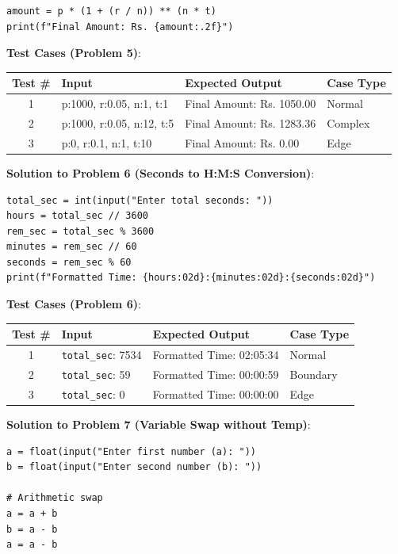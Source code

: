 \begin{solutionbox}
\begin{lstlisting}[language=Python3]
amount = p * (1 + (r / n)) ** (n * t)
print(f"Final Amount: Rs. {amount:.2f}")
\end{lstlisting}
\vspace{4pt}
\noindent\textbf{Test Cases (Problem 5)}:

\noindent\begin{tabular}{|c|p{4cm}|p{4.5cm}|p{2.2cm}|}
\hline
\textbf{Test \#} & \textbf{Input} & \textbf{Expected Output} & \textbf{Case Type} \\
\hline
1 & p:1000, r:0.05, n:1, t:1 & Final Amount: Rs. 1050.00 & Normal \\
2 & p:1000, r:0.05, n:12, t:5 & Final Amount: Rs. 1283.36 & Complex \\
3 & p:0, r:0.1, n:1, t:10 & Final Amount: Rs. 0.00 & Edge \\
\hline
\end{tabular}
\vspace{8pt}

\noindent\textbf{Solution to Problem 6 (Seconds to H:M:S Conversion)}:
\begin{lstlisting}[language=Python3]
total_sec = int(input("Enter total seconds: "))
hours = total_sec // 3600
rem_sec = total_sec % 3600
minutes = rem_sec // 60
seconds = rem_sec % 60
print(f"Formatted Time: {hours:02d}:{minutes:02d}:{seconds:02d}")
\end{lstlisting}
\vspace{4pt}
\noindent\textbf{Test Cases (Problem 6)}:

\noindent\begin{tabular}{|c|p{4cm}|p{4.5cm}|p{2.2cm}|}
\hline
\textbf{Test \#} & \textbf{Input} & \textbf{Expected Output} & \textbf{Case Type} \\
\hline
1 & \texttt{total\_sec}: 7534 & Formatted Time: 02:05:34 & Normal \\
2 & \texttt{total\_sec}: 59 & Formatted Time: 00:00:59 & Boundary \\
3 & \texttt{total\_sec}: 0 & Formatted Time: 00:00:00 & Edge \\
\hline
\end{tabular}
\vspace{8pt}

\noindent\textbf{Solution to Problem 7 (Variable Swap without Temp)}:
\begin{lstlisting}[language=Python3]
a = float(input("Enter first number (a): "))
b = float(input("Enter second number (b): "))

# Arithmetic swap
a = a + b
b = a - b
a = a - b


\end{lstlisting}
\end{solutionbox}
